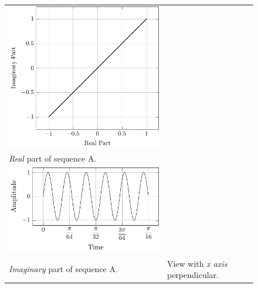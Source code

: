 \documentclass[../../course]{subfiles}
\begin{document}
\begin{figure} [H]
\begin{NiceTabularX} {\textwidth} {
            *{2}{>{\centering\arraybackslash}X}
        }
         {
             {
                \includegraphics[height = \textheight] {tikzpics/plotFrontViewComplexA.pdf}
            }
        }

        \\

         {\emph{Real} part of sequence A.}
        \label{plt:realCmplxA}

        &
        \\

         {
             {
                \includegraphics[height = \textheight] {tikzpics/plotShortX1.pdf}
            }
        }

        &
        \\

         {\emph{Imaginary} part of sequence A.}
        \label{plt:imagCmplxA}

        &

         {View with \emph{x axis} perpendicular.}
        \label{plt:frontViewCmplxA}

        \\

    \end{NiceTabularX}

\end{figure}
\end{document}

